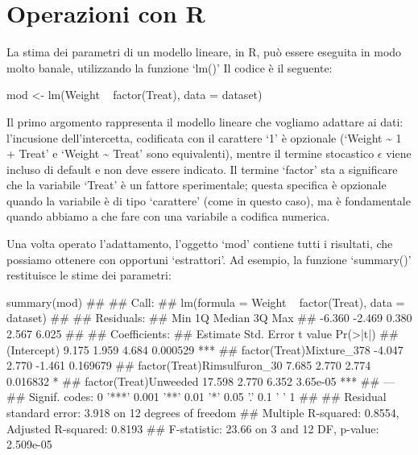 \documentclass[a4paper,12pt,oneside]{book}
\newenvironment{Shaded}{}{}
\newcommand{\KeywordTok}[1]{#1}
\newcommand{\DataTypeTok}[1]{#1}
\newcommand{\StringTok}[1]{#1}
\newcommand{\CommentTok}[1]{#1}
\newcommand{\OperatorTok}[1]{#1}
\newcommand{\NormalTok}[1]{#1}
\begin{document}
\hypertarget{operazioni-con-r}{%
\section{Operazioni con R}\label{operazioni-con-r}}

La stima dei parametri di un modello lineare, in R, può essere eseguita in modo molto banale, utilizzando la funzione `lm()' Il codice è il seguente:

\begin{Shaded}
\begin{Highlighting}[]
\NormalTok{mod <-}\StringTok{ }\KeywordTok{lm}\NormalTok{(Weight }\OperatorTok{~}\StringTok{ }\KeywordTok{factor}\NormalTok{(Treat), }\DataTypeTok{data =}\NormalTok{ dataset)}
\end{Highlighting}
\end{Shaded}

Il primo argomento rappresenta il modello lineare che vogliamo adattare ai dati: l'incusione dell'intercetta, codificata con il carattere `1' è opzionale (`Weight \textasciitilde{} 1 + Treat' e `Weight \textasciitilde{} Treat' sono equivalenti), mentre il termine stocastico \(\epsilon\) viene incluso di default e non deve essere indicato. Il termine `factor' sta a significare che la variabile `Treat' è un fattore sperimentale; questa specifica è opzionale quando la variabile è di tipo `carattere' (come in questo caso), ma è fondamentale quando abbiamo a che fare con una variabile a codifica numerica.

Una volta operato l'adattamento, l'oggetto `mod' contiene tutti i risultati, che possiamo ottenere con opportuni `estrattori'. Ad esempio, la funzione `summary()' restituisce le stime dei parametri:

\scriptsize

\begin{Shaded}
\begin{Highlighting}[]
\KeywordTok{summary}\NormalTok{(mod)}
\CommentTok{## }
\CommentTok{## Call:}
\CommentTok{## lm(formula = Weight ~ factor(Treat), data = dataset)}
\CommentTok{## }
\CommentTok{## Residuals:}
\CommentTok{##    Min     1Q Median     3Q    Max }
\CommentTok{## -6.360 -2.469  0.380  2.567  6.025 }
\CommentTok{## }
\CommentTok{## Coefficients:}
\CommentTok{##                             Estimate Std. Error t value Pr(>|t|)    }
\CommentTok{## (Intercept)                    9.175      1.959   4.684 0.000529 ***}
\CommentTok{## factor(Treat)Mixture_378      -4.047      2.770  -1.461 0.169679    }
\CommentTok{## factor(Treat)Rimsulfuron_30    7.685      2.770   2.774 0.016832 *  }
\CommentTok{## factor(Treat)Unweeded         17.598      2.770   6.352 3.65e-05 ***}
\CommentTok{## ---}
\CommentTok{## Signif. codes:  0 '***' 0.001 '**' 0.01 '*' 0.05 '.' 0.1 ' ' 1}
\CommentTok{## }
\CommentTok{## Residual standard error: 3.918 on 12 degrees of freedom}
\CommentTok{## Multiple R-squared:  0.8554, Adjusted R-squared:  0.8193 }
\CommentTok{## F-statistic: 23.66 on 3 and 12 DF,  p-value: 2.509e-05}
\end{Highlighting}
\end{Shaded}
\end{document}
